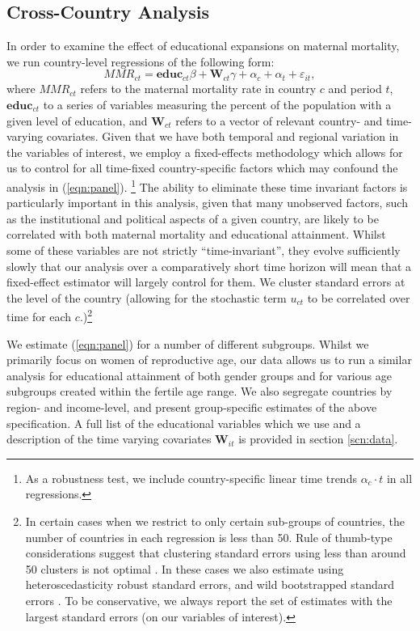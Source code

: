 \documentclass{article}[12pt,subeqn]
\begin{document}
\begin{spacing}{1.4}
\subsection{Cross-Country Analysis}
In order to examine the effect of educational expansions on maternal mortality, 
we run country-level regressions of the following form:
\begin{equation}
\label{eqn:panel}
   MMR_{ct}=\mathbf{educ}_{ct}\beta + \mathbf{W}_{ct}\gamma+\alpha_c+\alpha_t+
   \varepsilon_{it},
\end{equation}
where $MMR_{ct}$ refers to the maternal mortality rate in country $c$ and period 
$t$, $\mathbf{educ}_{ct}$ to a series of variables measuring the percent of the 
population with a given level of education, and $\mathbf{W}_{ct}$ refers to a 
vector of relevant country- and time-varying covariates.  Given that we have both 
temporal and regional variation in the variables of interest, we employ a 
fixed-effects methodology which allows for us to control for all time-fixed 
country-specific factors which may confound the analysis in (\ref{eqn:panel}).%
\footnote{As a robustness test, we include country-specific linear time trends
$\alpha_c\cdot t$ in all regressions.}
The ability to eliminate these time invariant factors is particularly important 
in this analysis, given that many unobserved factors, such as the institutional 
and political aspects of a given country, are likely to be correlated with both 
maternal mortality and educational attainment. Whilst some of these variables are 
not strictly ``time-invariant'', they evolve sufficiently slowly that our analysis 
over a comparatively short time horizon will mean that a fixed-effect estimator 
will largely control for them. We cluster standard errors at the level of the 
country (allowing for the stochastic term $u_{ct}$ to be correlated over time for 
each $c$.)\footnote{In certain cases when we restrict to only certain sub-groups
of countries, the number of countries in each regression is less than 50.  Rule
of thumb-type considerations suggest that clustering standard errors using less
than around 50 clusters is not optimal \citep{AngristPischke2009,NicholsSchaffer2007}.  
In these cases we also estimate using heteroscedasticity robust standard errors, 
and wild bootstrapped standard errors \citep{MackinnonWebb2014,CameronMiller2015}. 
To be conservative, we always report the set of estimates with the largest 
standard errors (on our variables of interest).}

We estimate (\ref{eqn:panel}) for a number of different subgroups. Whilst we
primarily focus on women of reproductive age, our data allows us to run a similar
analysis for educational attainment of both gender groups and for various age
subgroups created within the fertile age range. We also segregate countries by
region- and income-level, and present group-specific estimates of the above
specification. A full list of the educational variables which we use and a 
description of the time varying covariates $\textbf{W}_{it}$ is provided in
section \ref{scn:data}. 


\end{spacing}
\end{document}
